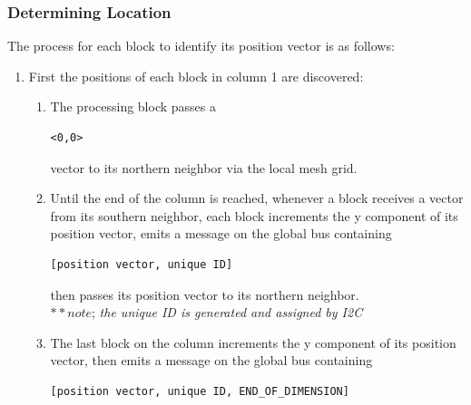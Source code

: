     \subsubsection{Determining Location}
      The process for each block to identify its position vector is as follows:
      \begin{enumerate}
        \item First the positions of each block in column 1 are discovered:
        \begin{enumerate}
          \item The processing block passes a \begin{verbatim}<0,0>\end{verbatim} vector to its northern neighbor via the local mesh grid.
          \item Until the end of the column is reached, whenever a block receives a vector from its southern neighbor, each block increments the y component of its position vector, emits a message on the global bus containing \begin{verbatim}[position vector, unique ID]\end{verbatim}then passes its position vector to its northern neighbor.\\
          $**note$; \textit{the unique ID is generated and assigned by I2C }
          \item The last block on the column increments the y component of its position vector, then emits a message on the global bus containing \begin{verbatim}[position vector, unique ID, END_OF_DIMENSION]\end{verbatim}
        \end{enumerate}
        

\end{enumerate}
